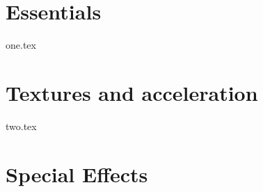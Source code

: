 

\addto\captionsenglish{\renewcommand{\chaptername}{Milestone}}



 
\tableofcontents
\setcounter{page}{0}

\chapter{Essentials}
{one.tex}

\chapter{Textures and acceleration}
{two.tex}

\chapter{Special Effects}

